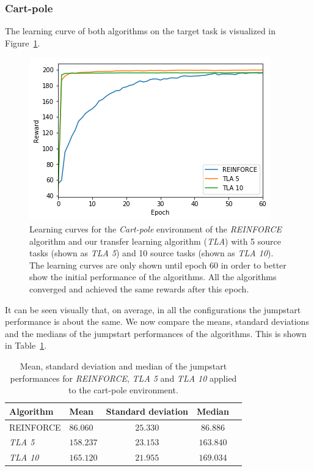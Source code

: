 \subsubsection{Cart-pole} %
\label{ssub:without_sparse_representation_transfer:cartpole}
The learning curve of both algorithms on the target task is visualized in Figure~\ref{fig:CartPole:reward_target_re-akt5-akt10}.
\begin{figure}[htb]
    \centering
    \includegraphics[width=.8\linewidth]{images/results/CartPole/no_sparse_transfer/reward_target_re-akt5-akt10.png}
    \caption[Learning curves for \textit{REINFORCE} and \textit{TLA} for the \emph{Cart-pole} environment]{Learning curves for the \textit{Cart-pole} environment of the \textit{REINFORCE} algorithm and our transfer learning algorithm (\textit{TLA}) with 5 source tasks (shown as \textit{TLA 5}) and 10 source tasks (shown as \textit{TLA 10}). The learning curves are only shown until epoch 60 in order to better show the initial performance of the algorithms. All the algorithms converged and achieved the same rewards after this epoch.}
    \label{fig:CartPole:reward_target_re-akt5-akt10}
\end{figure}
It can be seen visually that, on average, in all the configurations the jumpstart performance is about the same. We now compare the means, standard deviations and the medians of the jumpstart performances of the algorithms. This is shown in Table~\ref{tab:cartpole:nosparse:stats}.
\begin{table}[htb]
    \centering
    \begin{tabular}{llccc}
    \hline
    Algorithm & Mean & Standard deviation & Median \\
    \hline
       REINFORCE  & $86.060$ & $25.330$ & $86.886$ \\
       \textit{TLA 5} & $158.237$ & $23.153$ & $163.840$ \\
       \textit{TLA 10} & $\bm{165.120}$ & $\bm{21.955}$ & $\bm{169.034}$ \\
    \hline
    \end{tabular}
    \caption{Mean, standard deviation and median of the jumpstart performances for \textit{REINFORCE}, \textit{TLA 5} and \textit{TLA 10} applied to the cart-pole environment.}
    \label{tab:cartpole:nosparse:stats}
\end{table}
